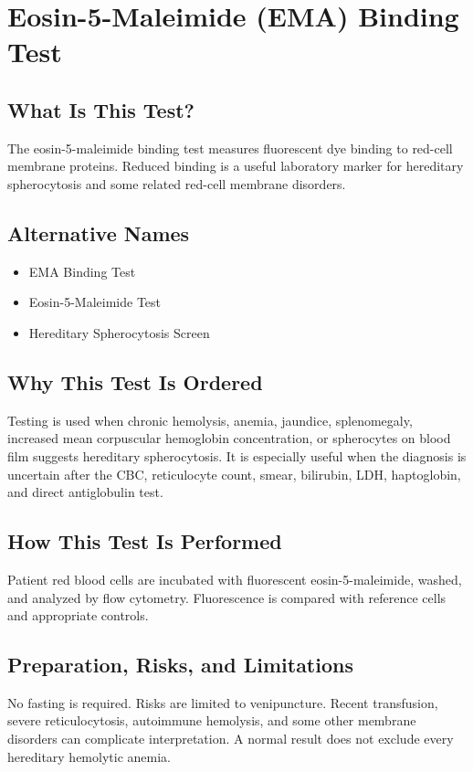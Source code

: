 \chapter{Eosin-5-Maleimide (EMA) Binding Test}

\section*{What Is This Test?}
The eosin-5-maleimide binding test measures fluorescent dye binding to red-cell membrane proteins. Reduced binding is a useful laboratory marker for hereditary spherocytosis and some related red-cell membrane disorders.

\section*{Alternative Names}
\begin{itemize}
  \item EMA Binding Test
  \item Eosin-5-Maleimide Test
  \item Hereditary Spherocytosis Screen
\end{itemize}
\section*{Why This Test Is Ordered}
Testing is used when chronic hemolysis, anemia, jaundice, splenomegaly, increased mean corpuscular hemoglobin concentration, or spherocytes on blood film suggests hereditary spherocytosis. It is especially useful when the diagnosis is uncertain after the CBC, reticulocyte count, smear, bilirubin, LDH, haptoglobin, and direct antiglobulin test.

\section*{How This Test Is Performed}
Patient red blood cells are incubated with fluorescent eosin-5-maleimide, washed, and analyzed by flow cytometry. Fluorescence is compared with reference cells and appropriate controls.

\section*{Preparation, Risks, and Limitations}
No fasting is required. Risks are limited to venipuncture. Recent transfusion, severe reticulocytosis, autoimmune hemolysis, and some other membrane disorders can complicate interpretation. A normal result does not exclude every hereditary hemolytic anemia.

